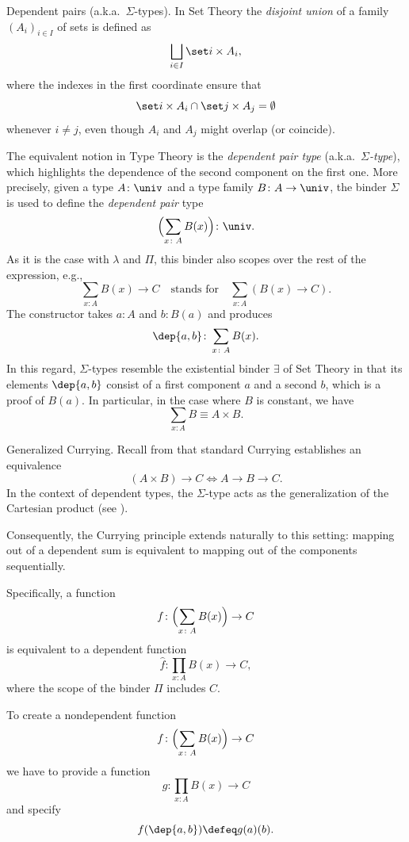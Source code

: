 \begin{lpar}{Dependent pairs \textrm{(a.k.a.~$\Sigma$-types)}.}
    \label{lpar:Sigma-types}
    In Set Theory the \textsl{disjoint union} of a family $(A_i)_{i\in I}$ of sets is defined as
    \[
        \bigsqcup_{i\in I}\set i\times A_i,
    \]
    where the indexes in the first coordinate ensure that
    \[
        \set i\times A_i\cap \set j\times A_j=\emptyset
    \]
    whenever $i\ne j$, even though $A_i$ and $A_j$ might overlap (or coincide).

    The equivalent notion in Type Theory is the \textsl{dependent pair type} (a.k.a.~\textsl{$\Sigma$-type}), which highlights the dependence of the second component on the first one. More precisely, given a type $A\colon\univ$ and a type family $B\colon A\to\univ$, the binder $\Sigma$ is used to define the \textsl{dependent pair} type
    \[
        \Bigl(\sum_{x\colon A}B(x)\Bigr)\colon\univ.
    \]
    As it is the case with $\lambda$ and $\Pi$, this binder also scopes over the rest of the expression, e.g.,
    \[
        \sum_{x\colon A}B(x)\to C\quad\text{stands for}\quad
            \sum_{x\colon A}(B(x)\to C).
    \]
    The constructor takes $a\colon A$ and $b\colon B(a)$ and produces
    \[
        \dep{a,b}\colon \sum_{x\colon A}B(x).
    \]
    In this regard, $\Sigma$-types resemble the existential binder $\exists$ of Set Theory in that its elements $\dep{a,b}$ consist of a first component $a$ and a second $b$, which is a proof of $B(a)$. In particular, in the case where $B$ is constant, we have
    \[
        \sum_{x\colon A}B\equiv A\times B.
    \]
\end{lpar}

\begin{lpar}{Generalized Currying.}\label{lpar:generalized-currying}
    Recall from   that standard Currying establishes an equivalence
    \[
        (A\times B)\to C \iff A\to B\to C.
    \]
    In the context of dependent types, the  $\Sigma$-type acts as the generalization of the Cartesian product (see  ).
    
    Consequently, the Currying principle extends naturally to this setting: mapping out of a dependent sum is equivalent to mapping out of the components sequentially.
    
    Specifically, a function
    \[
        f\colon\Bigl(\sum_{x\colon A}B(x)\Bigr)\to C
    \]
    is equivalent to a dependent function
    \[
        \hat f\colon\prod_{x\colon A}B(x)\to C,
    \]
    where the scope of the binder $\Pi$ includes $C$.

    To create a nondependent function
    \[
        f\colon\Bigl(\sum_{x\colon A}B(x)\Bigr)\to C
    \]
    we have to provide a function
    \[
        g\colon\prod_{x\colon A}B(x)\to C
    \]
    and specify
    \[
        f(\dep{a,b}) \defeq g(a)(b).
    \]
\end{lpar}

